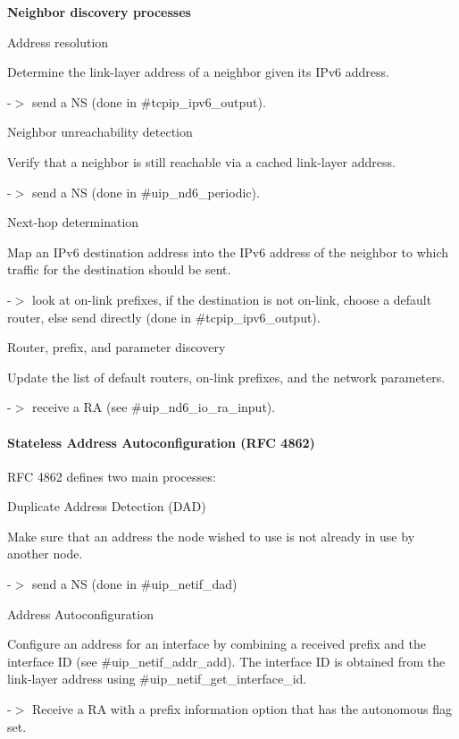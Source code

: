 {\bfseries \-Neighbor discovery processes }\par
 \begin{DoxyItemize}
\item \-Address resolution\par
 \-Determine the link-\/layer address of a neighbor given its \-I\-Pv6 address.\par
 -\/$>$ send a \-N\-S (done in \#tcpip\-\_\-ipv6\-\_\-output). \item \-Neighbor unreachability detection\par
 \-Verify that a neighbor is still reachable via a cached link-\/layer address.\par
 -\/$>$ send a \-N\-S (done in \#uip\-\_\-nd6\-\_\-periodic). \item \-Next-\/hop determination\par
 \-Map an \-I\-Pv6 destination address into the \-I\-Pv6 address of the neighbor to which traffic for the destination should be sent.\par
 -\/$>$ look at on-\/link prefixes, if the destination is not on-\/link, choose a default router, else send directly (done in \#tcpip\-\_\-ipv6\-\_\-output). \item \-Router, prefix, and parameter discovery\par
 \-Update the list of default routers, on-\/link prefixes, and the network parameters.\par
 -\/$>$ receive a \-R\-A (see \#uip\-\_\-nd6\-\_\-io\-\_\-ra\-\_\-input).\end{DoxyItemize}
\hypertarget{a00061_autoconf}{}\paragraph{\-Stateless Address Autoconfiguration (\-R\-F\-C 4862)}\label{a00061_autoconf}
\-R\-F\-C 4862 defines two main processes\-: \begin{DoxyItemize}
\item \-Duplicate \-Address \-Detection (\-D\-A\-D)\par
 \-Make sure that an address the node wished to use is not already in use by another node.\par
 -\/$>$ send a \-N\-S (done in \#uip\-\_\-netif\-\_\-dad) \item \-Address \-Autoconfiguration\par
 \-Configure an address for an interface by combining a received prefix and the interface \-I\-D (see \#uip\-\_\-netif\-\_\-addr\-\_\-add). \-The interface \-I\-D is obtained from the link-\/layer address using \#uip\-\_\-netif\-\_\-get\-\_\-interface\-\_\-id.\par
 -\/$>$ \-Receive a \-R\-A with a prefix information option that has the autonomous flag set.\end{DoxyItemize}
